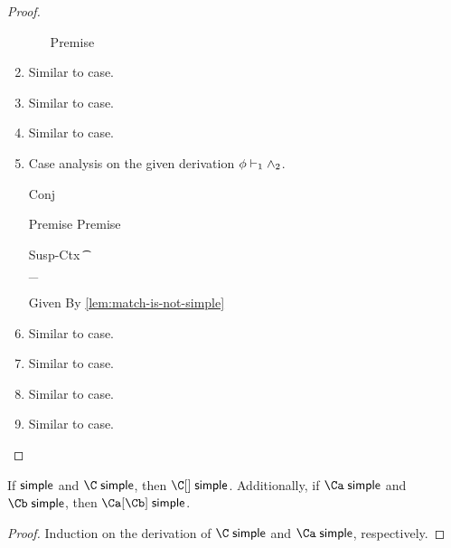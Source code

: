 \documentclass[acmsmall,screen,nonacm,review]{acmart}
\begin{document}
\begin{lemma}
\begin{proof}
\begin{enumerate}[(\roman*)]
\begin{itemize}
	    \begin{llproof}
\Hand 		\eqPf{\semenv(\tone)}{\semenv(\ttwo)}  {Premise}
	    \end{llproof}
	\end{itemize}

      \item Similar to  case.
      \item Similar to  case.
      \item Similar to  case.

      \item Case analysis on the given derivation $\phi \vdash \relax_1 \wedge \relax_2$.
      \begin{itemize}
	\proofcasederivation
	  {Conj}
	  {\semenv \th \cone \\ \semenv \th \ctwo}
	  {\semenv \th \cone \cand \ctwo}

	\begin{llproof}
\Hand 	  \vdashPf{\semenv}{\cone} {Premise}
\Hand     \vdashPf{\semenv}{\ctwo} {Premise}
	\end{llproof}

	\proofcasederivation
	  {Susp-Ctx}
	  {\Cshape \C \t \sh \\ \semenv \th \C\where{\cmatched \t \sh \cbrs}}
	  {\semenv \th \underbrace{\C\where{\cmatch \t \cbrs}}_{\cone \cand \ctwo}}

	\begin{llproof}
	  \simplePf{\C\where{\cmatch \t \cbrs}} {Given}
	  \nsimplePf{\C\where{\cmatch \t \cbrs}} {By \cref{lem:match-is-not-simple}}
\Hand 	  \contraPf{\semenv \th \cone, \semenv \th \ctwo}
	\end{llproof}

      \end{itemize}

      \item Similar to  case.
      \item Similar to  case.
      \item Similar to  case.
      \item Similar to  case.
    \end{enumerate}
  \end{proof}
\end{lemma}

\begin{lemma}
  \label{lem:compose-simple}
  If $\relax \mathrel{\mathsf{simple}}\mathclose{}$ and $\C \simple$, then $\C\where\c \simple$.
  Additionally, if $\Ca \simple$ and $\Cb \simple$, then $\Ca\where\Cb \simple$.
  \begin{proof}
    Induction on the derivation of $\C \simple$ and $\Ca \simple$, respectively.
  \end{proof}
\end{lemma}
\end{document}
